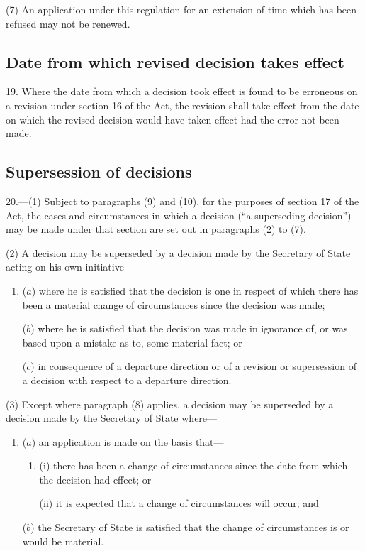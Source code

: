 \documentclass[a4paper,12pt]{article}
\begin{document}
(7) An application under this regulation for an extension of time which has been refused may not be renewed.

\subsection[19. Date from which revised decision takes effect]{Date from which revised decision takes effect}

19.  Where the date from which a decision took effect is found to be erroneous on a revision under section 16 of the Act, the revision shall take effect from the date on which the revised decision would have taken effect had the error not been made.

\subsection[20. Supersession of decisions]{Supersession of decisions}

20.—(1) Subject to paragraphs (9) and (10), for the purposes of section 17 of the Act, the cases and circumstances in which a decision (“a superseding decision”) may be made under that section are set out in paragraphs (2) to (7).

(2) A decision may be superseded by a decision made by the Secretary of State acting on his own initiative---
\begin{enumerate}\item[]
($a$) where he is satisfied that the decision is one in respect of which there has been a material change of circumstances since the decision was made;

($b$) where he is satisfied that the decision was made in ignorance of, or was based upon a mistake as to, some material fact; or

($c$) in consequence of a departure direction or of a revision or supersession of a decision with respect to a departure direction.
\end{enumerate}

(3) Except where paragraph (8) applies, a decision may be superseded by a decision made by the Secretary of State where---
\begin{enumerate}\item[]
($a$) an application is made on the basis that---
\begin{enumerate}\item[]
(i) there has been a change of circumstances 
since the date from which the decision had effect;  %
or

(ii) it is expected that a change of circumstances will occur; and
\end{enumerate}

($b$) the Secretary of State is satisfied that the change of circumstances is or would be material.
\end{enumerate}
\end{document}
